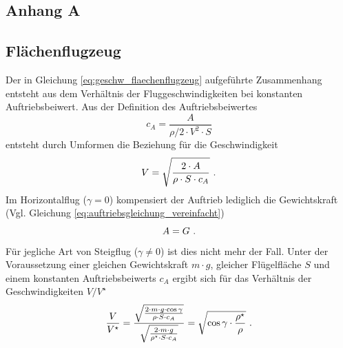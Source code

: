 \begin{appendix}
\chapter{Anhang A}
\label{chap:anhang_a}

\section{Flächenflugzeug}
\label{sec:herleitung_geschw_bez}
Der in Gleichung \ref{eq:geschw_flaechenflugzeug} aufgeführte Zusammenhang entsteht aus dem Verhältnis der Fluggeschwindigkeiten bei konstanten Auftriebsbeiwert. Aus der Definition des Auftriebsbeiwertes
\begin{equation}
	c_{A} = \frac{A}{\rho/2\cdot V^2\cdot S}
\end{equation}
entsteht durch Umformen die Beziehung für die Geschwindigkeit
\begin{equation}
	V = \sqrt{\frac{2\cdot A}{\rho\cdot S \cdot c_{A}}} ~\text{.}
\end{equation}
Im Horizontalflug (\ensuremath{\gamma = 0}) kompensiert der Auftrieb lediglich die Gewichtskraft (Vgl. Gleichung \ref{eq:auftriebsgleichung_vereinfacht})
\begin{equation}
	A = G ~\text{.}
\end{equation}
Für jegliche Art von Steigflug (\ensuremath{\gamma \neq 0}) ist dies nicht mehr der Fall. Unter der Voraussetzung einer gleichen Gewichtskraft \ensuremath{m\cdot g}, gleicher Flügelfläche \ensuremath{S} und einem konstanten Auftriebsbeiwerts \ensuremath{c_{A}} ergibt sich für das Verhältnis der Geschwindigkeiten \ensuremath{V/V^\star}
\begin{equation}
	\frac{V}{V^\star} = \frac{\sqrt{\frac{2\cdot m \cdot g\cdot \cos\gamma}{\rho\cdot S \cdot c_{A}}}}{\sqrt{\frac{2\cdot m\cdot g}{\rho^\star \cdot S \cdot c_{A}}}} = \sqrt{\cos\gamma\cdot\frac{\rho^\star}{\rho}} ~\text{.}
\end{equation}\\


\end{appendix}
